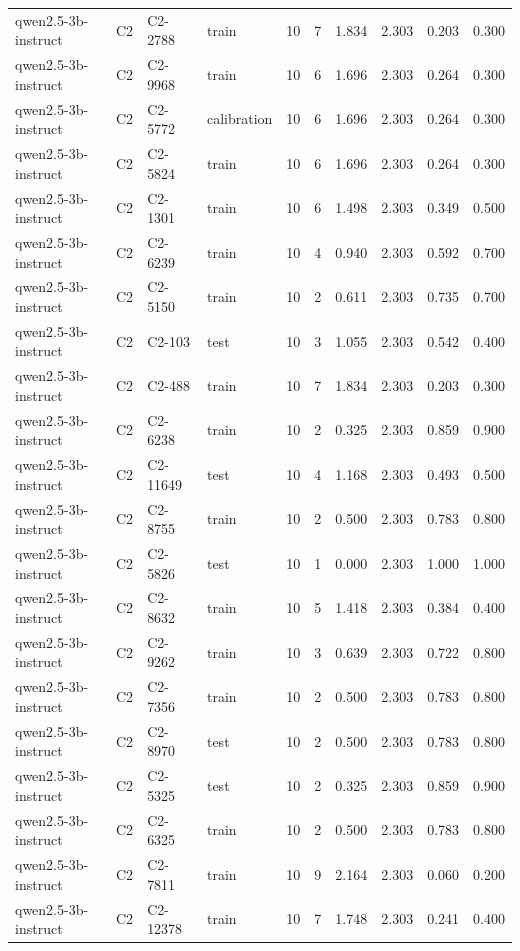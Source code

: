 \begin{table}
\begin{tabular}{llllrrrrrr}
qwen2.5-3b-instruct & C2 & C2-2788 & train & 10 & 7 & 1.834 & 2.303 & 0.203 & 0.300 \\
qwen2.5-3b-instruct & C2 & C2-9968 & train & 10 & 6 & 1.696 & 2.303 & 0.264 & 0.300 \\
qwen2.5-3b-instruct & C2 & C2-5772 & calibration & 10 & 6 & 1.696 & 2.303 & 0.264 & 0.300 \\
qwen2.5-3b-instruct & C2 & C2-5824 & train & 10 & 6 & 1.696 & 2.303 & 0.264 & 0.300 \\
qwen2.5-3b-instruct & C2 & C2-1301 & train & 10 & 6 & 1.498 & 2.303 & 0.349 & 0.500 \\
qwen2.5-3b-instruct & C2 & C2-6239 & train & 10 & 4 & 0.940 & 2.303 & 0.592 & 0.700 \\
qwen2.5-3b-instruct & C2 & C2-5150 & train & 10 & 2 & 0.611 & 2.303 & 0.735 & 0.700 \\
qwen2.5-3b-instruct & C2 & C2-103 & test & 10 & 3 & 1.055 & 2.303 & 0.542 & 0.400 \\
qwen2.5-3b-instruct & C2 & C2-488 & train & 10 & 7 & 1.834 & 2.303 & 0.203 & 0.300 \\
qwen2.5-3b-instruct & C2 & C2-6238 & train & 10 & 2 & 0.325 & 2.303 & 0.859 & 0.900 \\
qwen2.5-3b-instruct & C2 & C2-11649 & test & 10 & 4 & 1.168 & 2.303 & 0.493 & 0.500 \\
qwen2.5-3b-instruct & C2 & C2-8755 & train & 10 & 2 & 0.500 & 2.303 & 0.783 & 0.800 \\
qwen2.5-3b-instruct & C2 & C2-5826 & test & 10 & 1 & 0.000 & 2.303 & 1.000 & 1.000 \\
qwen2.5-3b-instruct & C2 & C2-8632 & train & 10 & 5 & 1.418 & 2.303 & 0.384 & 0.400 \\
qwen2.5-3b-instruct & C2 & C2-9262 & train & 10 & 3 & 0.639 & 2.303 & 0.722 & 0.800 \\
qwen2.5-3b-instruct & C2 & C2-7356 & train & 10 & 2 & 0.500 & 2.303 & 0.783 & 0.800 \\
qwen2.5-3b-instruct & C2 & C2-8970 & test & 10 & 2 & 0.500 & 2.303 & 0.783 & 0.800 \\
qwen2.5-3b-instruct & C2 & C2-5325 & test & 10 & 2 & 0.325 & 2.303 & 0.859 & 0.900 \\
qwen2.5-3b-instruct & C2 & C2-6325 & train & 10 & 2 & 0.500 & 2.303 & 0.783 & 0.800 \\
qwen2.5-3b-instruct & C2 & C2-7811 & train & 10 & 9 & 2.164 & 2.303 & 0.060 & 0.200 \\
qwen2.5-3b-instruct & C2 & C2-12378 & train & 10 & 7 & 1.748 & 2.303 & 0.241 & 0.400 \\

\end{tabular}
\end{table}
